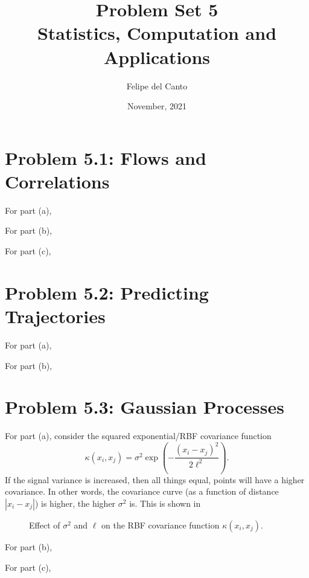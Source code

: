 \documentclass[11pt, english]{article}
\title{\bf Problem Set 5 \\ Statistics, Computation and
Applications\\[-1ex]}
\author{Felipe del Canto}
\date{November, 2021}
\begin{document}
    
\maketitle
   
\begin{multicols}{2}

\section*{Problem 5.1: Flows and Correlations}

For part (a),

For part (b),

For part (c),

\section*{Problem 5.2: Predicting Trajectories}

For part (a),

For part (b),


\section*{Problem 5.3: Gaussian Processes}

For part (a), consider the squared exponential/RBF covariance function
	$$\kappa(x_{i}, x_{j}) = \sigma^{2}\exp\left(-\frac{(x_{i} - x_{j})^{2}}{2\ell^{2}}\right).$$
If the signal variance is increased, then all things equal, points will have a higher covariance. In other words, the covariance curve (as a function of distance $|x_{i} - x_{j}|$) is higher, the higher $\sigma^{2}$ is. This is shown in

\begin{figure*}
	\caption{Effect of $\sigma^{2}$ and $\ell$ on the RBF covariance function $\kappa(x_{i}, x_{j})$.}

\end{figure*}


For part (b),

For part (c),




\end{multicols}
\end{document}
